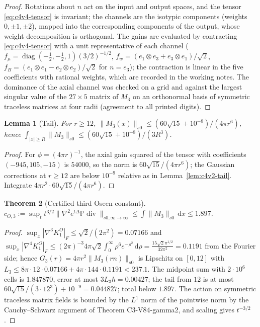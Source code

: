 \documentclass[11pt]{article}
\newcommand{\dd}{\,\mathrm d}
\newcommand{\PP}{\mathbb P}
\theoremstyle{plain}
\newtheorem{theorem}{Theorem}[section]
\newtheorem{lemma}[theorem]{Lemma}
\theoremstyle{definition}
\theoremstyle{remark}
\begin{document}
\begin{proof}
Rotations about \(n\) act on the input and output spaces, and the
tensor \eqref{eq:c4v4-tensor} is invariant; the channels are the
isotypic components (weights \(0,\pm1,\pm2\)), mapped into the
corresponding components of the output, whose weight decomposition
is orthogonal.  The gains are evaluated by contracting
\eqref{eq:c4v4-tensor} with a unit representative of each channel
(\(f_\mu=\operatorname{diag}(-\frac12,-\frac12,1)(3/2)^{-1/2}\), \(f_w=(e_1\otimes e_3+e_3\otimes e_1)/\sqrt2\),
\(f_B=(e_1\otimes e_1-e_2\otimes e_2)/\sqrt2\) for \(n=e_3\)); the contraction is linear in the
five coefficients with rational weights, which are recorded in the
working notes.  The dominance of the axial channel was checked on a
grid and against the largest singular value of the \(27\times5\) matrix of
\(M_3\) on an orthonormal basis of symmetric traceless matrices at four
radii (agreement to all printed digits).
\end{proof}

\begin{lemma}[Tail]
\label{lem:c4v4-tail}
For \(r\ge12\), \(\|M_3(x)\|_{s0}\le(60\sqrt{15}+10^{-8})/(4\pi r^6)\), hence
\(\int_{|x|\ge R}\|M_3\|_{s0}\le(60\sqrt{15}+10^{-8})/(3R^3)\).
\end{lemma}

\begin{proof}
For \(\phi=(4\pi r)^{-1}\), the axial gain squared of the tensor with
coefficients \((-945,105,-15)\) is \(54000\), so the norm is \(60\sqrt{15}/(4\pi r^6)\);
the Gaussian corrections at \(r\ge12\) are below \(10^{-9}\) relative as in
Lemma~\ref{lem:c4v2-tail}.  Integrate \(4\pi r^2\cdot60\sqrt{15}/(4\pi r^6)\).
\end{proof}

\begin{theorem}[Certified third Oseen constant]
\label{thm:c4v4-certified}
\(c_{O,3}:=\sup_tt^{3/2}\|\nabla^2e^{t\Delta}\PP\operatorname{div}\|_{s0,\infty\to\infty}\le\int\|M_3\|_{s0}\dd x\le1.897\).
\end{theorem}

\begin{proof}
\(\sup_x|\nabla^3K^O_1|_F\le\sqrt2/(2\pi^2)=0.07166\) and
\(\sup_x|\nabla^4K^O_1|_F\le(2\pi)^{-3}4\pi\sqrt2\int_0^\infty\rho^6e^{-\rho^2}\dd\rho=\frac{15\sqrt2\pi^{1/2}}{32\pi^2}=0.1191\) from the
Fourier side; hence \(G_3(r)=4\pi r^2\|M_3(rn)\|_{s0}\) is Lipschitz on \([0,12]\) with
\(L_3\le8\pi\cdot12\cdot0.07166+4\pi\cdot144\cdot0.1191<237.1\).  The midpoint sum with
\(2\cdot10^6\) cells is \(1.847870\), error at most \(3L_3h=0.00427\); the tail from
\(12\) is at most \(60\sqrt{15}/(3\cdot12^3)+10^{-9}=0.044827\); total below \(1.897\).  The
action on symmetric traceless matrix fields is bounded by the
\(L^1\) norm of the pointwise norm by the Cauchy--Schwarz argument of
Theorem C3-V84-gamma2, and scaling gives \(t^{-3/2}\).
\end{proof}
\end{document}
